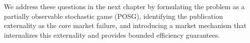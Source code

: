 We address these questions in the next chapter by formulating the problem as a partially observable stochastic game (POSG), identifying the publication externality as the core market failure, and introducing a market mechanism that internalizes this externality and provides bounded efficiency guarantees.